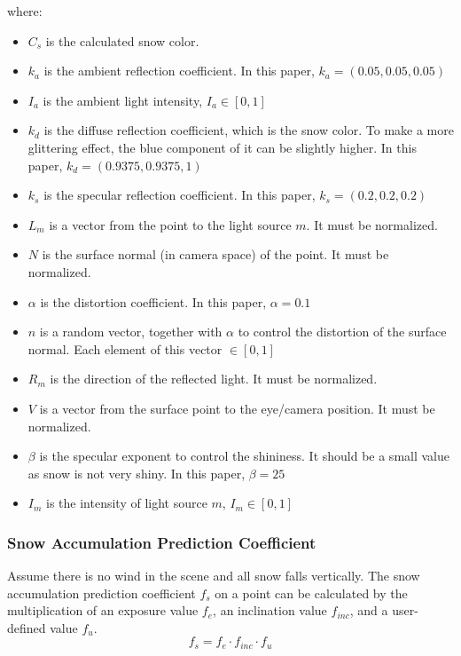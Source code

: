 \documentclass{article}
\begin{document}
where:
\begin{itemize}
  \item \( C_{s} \) is the calculated snow color.
  \item \( k_a \) is the ambient reflection coefficient. In this paper, \( k_a = (0.05, 0.05, 0.05)\)
  \item \( I_a \) is the ambient light intensity, \( I_a \in [0, 1]\)
  \item \( k_d \) is the diffuse reflection coefficient, which is the snow color. To make a more glittering effect, %
  the blue component of it can be slightly higher. In this paper, \( k_d = (0.9375, 0.9375, 1)\)
  \item \( k_s \) is the specular reflection coefficient. In this paper, \( k_s = (0.2, 0.2, 0.2)\)
  \item \( L_m \) is a vector from the point to the light source \( m \). It must be normalized.
  \item \( N \) is the surface normal (in camera space) of the point. It must be normalized.
  \item \( \alpha \) is the distortion coefficient. In this paper, \( \alpha = 0.1\)
  \item \( n \) is a random vector, together with \( \alpha \) to control the distortion of the surface normal. Each 
  element of this vector \(\in [0, 1]\)
  \item \( R_m \) is the direction of the reflected light. It must be normalized.
  \item \( V \) is a vector from the surface point to the eye/camera position. It must be normalized.
  \item \( \beta \) is the specular exponent to control the shininess. It should be a small value as snow is not 
  very shiny. In this paper, \( \beta = 25\)
  \item \( I_m \) is the intensity of light source \( m \), \( I_m \in [0, 1]\)
\end{itemize}

\subsubsection {Snow Accumulation Prediction Coefficient}
Assume there is no wind in the scene and all snow falls vertically. The snow accumulation prediction coefficient 
\( f_{s} \) on a point can be calculated by the multiplication of an exposure value \( f_{e} \), an inclination 
value \( f_{inc} \), and a user-defined value \( f_{u} \).
\[
  f_{s} = f_{e} \cdot f_{inc} \cdot f_{u}
\]
\end{document}
